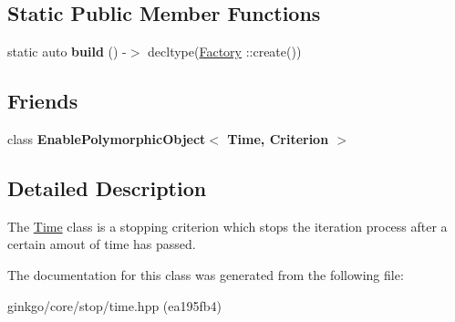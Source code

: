 \subsection*{Static Public Member Functions}
\begin{DoxyCompactItemize}
\item 
\mbox{\label{classgko_1_1stop_1_1Time_abe52acfe2a9de19d6b16e36497bac556}} 
static auto {\bfseries build} () -\/$>$ decltype(\hyperlink{classgko_1_1stop_1_1Time_1_1Factory}{Factory} \+::create())
\end{DoxyCompactItemize}
\subsection*{Friends}
\begin{DoxyCompactItemize}
\item 
\mbox{\label{classgko_1_1stop_1_1Time_a0ad01ce3f53eb68b4841ead2a7bf5406}} 
class {\bfseries Enable\+Polymorphic\+Object$<$ Time, Criterion $>$}
\end{DoxyCompactItemize}


\subsection{Detailed Description}
The \hyperlink{classgko_1_1stop_1_1Time}{Time} class is a stopping criterion which stops the iteration process after a certain amout of time has passed. 

The documentation for this class was generated from the following file\+:\begin{DoxyCompactItemize}
\item 
ginkgo/core/stop/time.\+hpp (ea195fb4)\end{DoxyCompactItemize}
